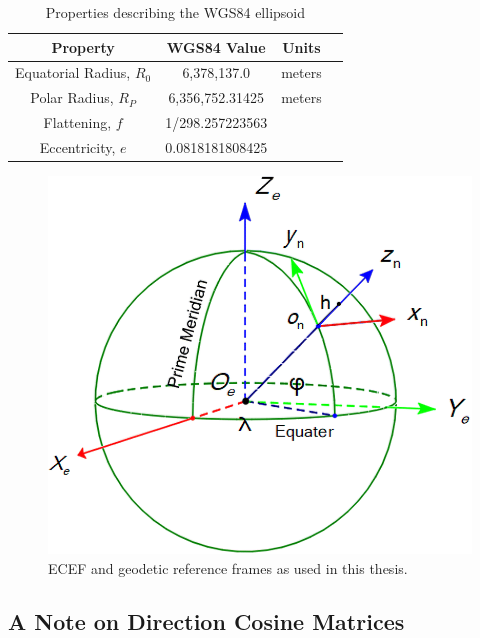 \documentclass[12pt]{report}
\begin{document}
\begin{table}[!ht]\label{tbl:wgs84}
  \caption{Properties describing the WGS84 ellipsoid}
  \centering
  \begin{tabular}{cccc}
    \toprule
    Property                   & WGS84 Value     & Units  \\
    \midrule
    Equatorial Radius, \(R_0\) & 6,378,137.0     & meters \\
    Polar Radius, \(R_P\)      & 6,356,752.31425 & meters \\
    Flattening, \(f\)          & 1/298.257223563 &        \\
    Eccentricity, \(e\)        & 0.0818181808425 &        \\
    \bottomrule
  \end{tabular}
\end{table}

\begin{figure}[!ht]\label{fig:globalframes}
  \centering
  \includegraphics[width=\linewidth]{Figures/globalframe.png}
  \caption{ECEF and geodetic reference frames as used in this thesis.}
\end{figure}

\subsection{A Note on Direction Cosine Matrices}
\end{document}

